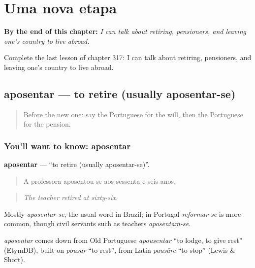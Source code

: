 
\chapter{Uma nova etapa}
\label{ch:pt-uma-nova-etapa}

\begin{chapteropening}
\textbf{By the end of this chapter:} \emph{I can talk about retiring, pensioners, and leaving one’s country to live abroad.}

Complete the last lesson of chapter 317: I can talk about retiring, pensioners, and leaving one’s country to live abroad.
\end{chapteropening}

\section[aposentar]{aposentar — to retire (usually aposentar-se)}

\label{lesson:PT-C317-aposentar}



\begin{quote}
Before the new one: say the Portuguese for the will, then the Portuguese for the pension.
\end{quote}

\subsection*{You'll want to know: aposentar}
\textbf{aposentar} — \textquotedblleft{}to retire (usually aposentar-se)\textquotedblright{}.

\begin{quote}
A professora aposentou-se aos sessenta e seis anos.
\end{quote}

\begin{quote}
\emph{The teacher retired at sixty-six.}
\end{quote}

Mostly \emph{aposentar-se}, the usual word in Brazil; in Portugal \emph{reformar-se} is more common, though civil servants such as teachers \emph{aposentam-se}.

\begin{cousinweb}
\emph{aposentar} comes down from Old Portuguese \emph{apousentar} \textquotedblleft{}to lodge, to give rest\textquotedblright{} (EtymDB), built on \emph{pousar} \textquotedblleft{}to rest\textquotedblright{}, from Latin \emph{pausāre} \textquotedblleft{}to stop\textquotedblright{} (Lewis \& Short).
\end{cousinweb}

